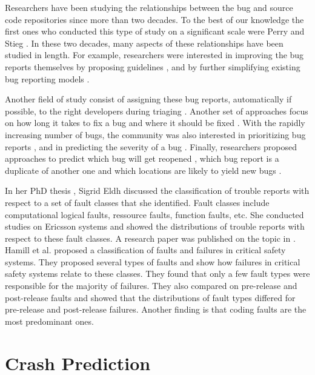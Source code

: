 Researchers have been studying the relationships between the bug and source code repositories since more than two decades.
To the best of our knowledge the first ones who conducted this type of study on a significant scale were Perry and Stieg \cite{PerryDewayneE.1993}.
In these two decades, many aspects of these relationships have been studied in length.
For example, researchers were interested in improving the bug reports themselves by proposing guidelines \cite{Bettenburg2008}, and by further simplifying existing bug reporting models \cite{Herraiz2008}.

Another field of study consist of assigning these bug reports, automatically if possible, to the right developers during triaging \cite{Anvik2006,Jeong2009,Tamrawi2011a,Bortis2013}.
Another set of approaches focus on how long it takes to fix a bug \cite{Bhattacharya2011,Zhang2013,Saha2014} and where it should be fixed \cite{Zeller2013a,Zhou2012}.
With the rapidly increasing number of bugs, the community was also interested in prioritizing bug reports \cite{Kim2011c}, and in predicting the severity of a bug \cite{Lamkanfi2010}.
Finally, researchers proposed approaches to predict which bug will get reopened \cite{Zimmermann2012,Lo2013}, which bug report is a duplicate of another one \cite{Bettenburg2008a,Tian2012a,Jalbert2008} and which locations are likely to yield new bugs \cite{Kim2006,Kim2007a}.

In her PhD thesis \cite{Eldh2001}, Sigrid Eldh discussed the classification of trouble reports with respect to a set of fault classes that she identified.
Fault classes include computational logical faults, ressource faults, function faults, etc.
She conducted studies on Ericsson systems and showed the distributions of trouble reports with respect to these fault classes.
A research paper was published on the topic in \cite{Eldh2007}.
Hamill et al.\cite{Hamill2014} proposed a classification of faults and failures in critical safety systems.
They proposed several types of faults and show how failures in critical safety systems relate to these classes.
They found that only a few fault types were responsible for the majority of failures.
They also compared on pre-release and post-release faults and showed that the distributions of fault types differed for pre-release and post-release failures.
Another finding is that coding faults are the most predominant ones.

\section{Crash Prediction}

